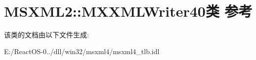 \hypertarget{class_m_s_x_m_l2_1_1_m_x_x_m_l_writer40}{}\section{M\+S\+X\+M\+L2\+:\+:M\+X\+X\+M\+L\+Writer40类 参考}
\label{class_m_s_x_m_l2_1_1_m_x_x_m_l_writer40}


该类的文档由以下文件生成\+:\begin{DoxyCompactItemize}
\item 
E\+:/\+React\+O\+S-\/0../dll/win32/msxml4/msxml4\+\_\+tlb.\+idl\end{DoxyCompactItemize}
